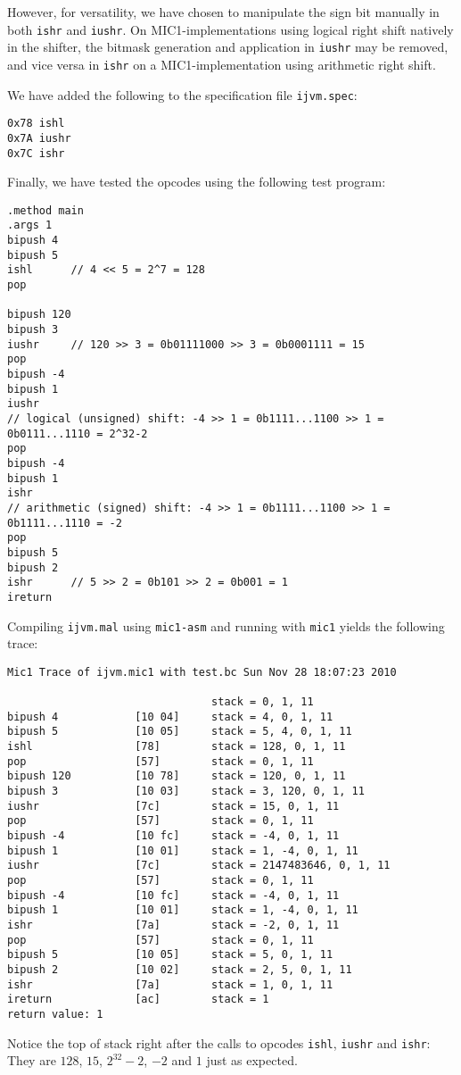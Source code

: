 \documentclass[12pt,a4paper]{article}
\newcommand{\ishl}{\texttt{ishl}}
\newcommand{\ishr}{\texttt{ishr}}
\newcommand{\iushr}{\texttt{iushr}}
\newcommand{\ijvmmal}{\texttt{ijvm.mal}}
\newcommand{\ijvmspec}{\texttt{ijvm.spec}}
\begin{document}
However, for versatility, we have chosen to manipulate the sign bit manually in
both \ishr{} and \iushr. On \textsc{MIC1}-implementations using logical right
shift natively in the shifter, the bitmask generation and application in
\iushr{} may be removed, and vice versa in \ishr{} on a MIC1-implementation
using arithmetic right shift.

We have added the following to the specification file \ijvmspec:
\begin{lstlisting}
0x78 ishl
0x7A iushr
0x7C ishr
\end{lstlisting}
Finally, we have tested the opcodes using the following test program:
\begin{lstlisting}
.method main
.args 1
bipush 4
bipush 5
ishl      // 4 << 5 = 2^7 = 128
pop

bipush 120
bipush 3
iushr     // 120 >> 3 = 0b01111000 >> 3 = 0b0001111 = 15
pop
bipush -4
bipush 1
iushr
// logical (unsigned) shift: -4 >> 1 = 0b1111...1100 >> 1 = 0b0111...1110 = 2^32-2
pop
bipush -4
bipush 1
ishr
// arithmetic (signed) shift: -4 >> 1 = 0b1111...1100 >> 1 = 0b1111...1110 = -2
pop
bipush 5
bipush 2
ishr      // 5 >> 2 = 0b101 >> 2 = 0b001 = 1
ireturn
\end{lstlisting}
Compiling \ijvmmal{} using \texttt{mic1-asm} and running with \texttt{mic1}
yields the following trace:
\begin{lstlisting}
Mic1 Trace of ijvm.mic1 with test.bc Sun Nov 28 18:07:23 2010

                                stack = 0, 1, 11
bipush 4            [10 04]     stack = 4, 0, 1, 11
bipush 5            [10 05]     stack = 5, 4, 0, 1, 11
ishl                [78]        stack = 128, 0, 1, 11
pop                 [57]        stack = 0, 1, 11
bipush 120          [10 78]     stack = 120, 0, 1, 11
bipush 3            [10 03]     stack = 3, 120, 0, 1, 11
iushr               [7c]        stack = 15, 0, 1, 11
pop                 [57]        stack = 0, 1, 11
bipush -4           [10 fc]     stack = -4, 0, 1, 11
bipush 1            [10 01]     stack = 1, -4, 0, 1, 11
iushr               [7c]        stack = 2147483646, 0, 1, 11
pop                 [57]        stack = 0, 1, 11
bipush -4           [10 fc]     stack = -4, 0, 1, 11
bipush 1            [10 01]     stack = 1, -4, 0, 1, 11
ishr                [7a]        stack = -2, 0, 1, 11
pop                 [57]        stack = 0, 1, 11
bipush 5            [10 05]     stack = 5, 0, 1, 11
bipush 2            [10 02]     stack = 2, 5, 0, 1, 11
ishr                [7a]        stack = 1, 0, 1, 11
ireturn             [ac]        stack = 1
return value: 1
\end{lstlisting}
Notice the top of stack right after the calls to opcodes \ishl, \iushr{} and
\ishr: They are $128$, $15$, $2^{32}-2$, $-2$ and $1$ just as expected.
\end{document}
